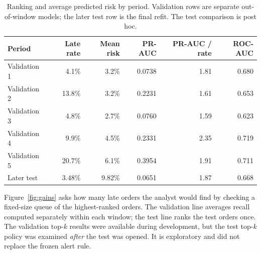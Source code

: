 \documentclass[12pt,a4paper]{article}
\begin{document}
\begin{table}[h]
\centering\small
\caption{Ranking and average predicted risk by period. Validation rows are separate out-of-window models; the later test row is the final refit. The test comparison is post hoc.}
\label{tab:periods}
\begin{tabular}{@{}lrrrrr@{}}
\toprule
Period & Late rate & Mean risk & PR-AUC & PR-AUC / rate & ROC-AUC \\
\midrule
Validation 1 & 4.1\% & 3.2\% & 0.0738 & 1.81 & 0.680 \\
Validation 2 & 13.8\% & 3.2\% & 0.2231 & 1.61 & 0.653 \\
Validation 3 & 4.8\% & 2.7\% & 0.0760 & 1.59 & 0.623 \\
Validation 4 & 9.9\% & 4.5\% & 0.2331 & 2.35 & 0.719 \\
Validation 5 & 20.7\% & 6.1\% & 0.3954 & 1.91 & 0.711 \\
Later test & 3.48\% & 9.82\% & 0.0651 & 1.87 & 0.668 \\
\bottomrule
\end{tabular}
\end{table}

Figure~\ref{fig:gains} asks how many late orders the analyst would find by checking a fixed-size queue of the highest-ranked orders. The validation line averages recall computed separately within each window; the test line ranks the test orders once. The validation top-$k$ results were available during development, but the test top-$k$ policy was examined \emph{after} the test was opened. It is exploratory and did not replace the frozen alert rule.
\end{document}
